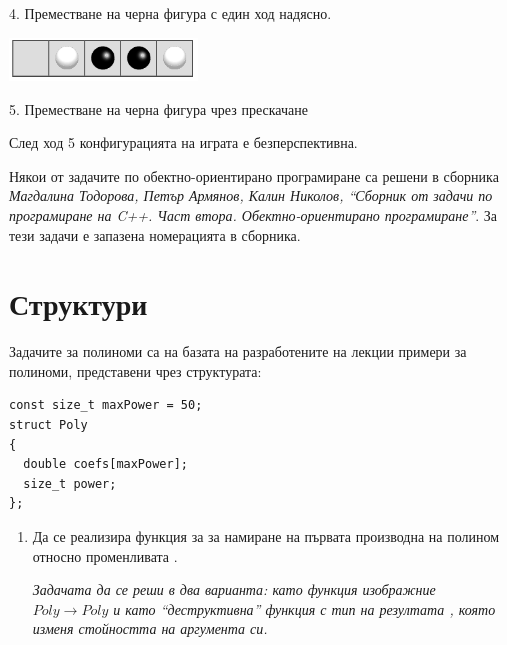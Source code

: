 {\begin{enumerate}[resume]
\begin{mdframed}[hidealllines=true,backgroundcolor=gray!20]
\begin{flushleft}
		4. Преместване на черна фигура с един ход надясно.
		\end{flushleft}

		\begin{flushleft}
		\includegraphics[width=5cm]{images/step4}

		5. Преместване на черна фигура чрез прескачане
		\end{flushleft}

		След ход 5 конфигурацията на играта е безперспективна.

	\end{mdframed}

\end{enumerate}

\pagebreak

\small{Някои от задачите по обектно-ориентирано програмиране са решени в сборника \cite{sbornik2}\textit{Магдалина Тодорова, Петър Армянов, Калин Николов, ``Сборник от задачи по програмиране на C++. Част втора. Обектно-ориентирано програмиране''}. За тези задачи е запазена номерацията в сборника.}

\pagebreak

\clearpage\section{Структури}

\begin{mdframed}[hidealllines=true,backgroundcolor=gray!20]
Задачите за полиноми са на базата на разработените на лекции примери за полиноми, представени чрез структурата:

\begin{verbatim}
const size_t maxPower = 50;
struct Poly
{
  double coefs[maxPower];
  size_t power;
};
\end{verbatim}
\end{mdframed}

\begin{enumerate}


  \item Да се реализира функция  за за намиране на първата производна на полином относно променливата .

  \emph{Задачата да се реши в два варианта: като функция изображние $Poly \rightarrow Poly$ и като ``деструктивна'' функция с тип на резултата , която изменя стойността на аргумента си.}


\end{enumerate}}
